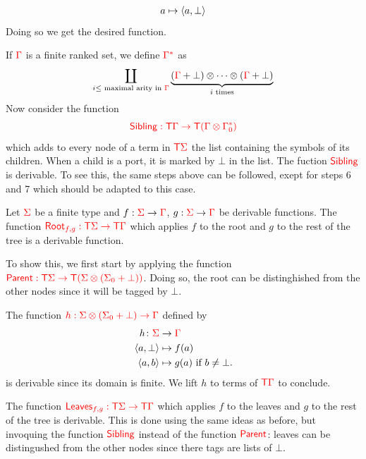 \begin{example}
\begin{enumerate}
\begin{align*}
a \mapsto \langle{a,\bot}\rangle
\end{align*}
 Doing so we get the desired function.
\end{enumerate}
\medskip
If ${\color{red}{\Gamma}}$ is a finite ranked set, we define ${\color{red}{\Gamma^*}}$ as
$$\coprod_{i \leq \text{ maximal arity in } {\color{red}{\Gamma}}} \underbrace{({\color{red}{\Gamma}}+\bot) \otimes \cdots \otimes ({\color{red}{\Gamma}}+\bot)}_{i\text{ times}}$$
Now consider the function $${\color{red}{\mathsf{Sibling}:{\color{red}{\mathsf T}}{\color{red}{\Gamma}}\to {\color{red}{\mathsf T}}({\color{red}{\Gamma}}\otimes {\color{red}{\Gamma}}^*_0)}}$$ which adds to every node of a term in ${\color{red}{\mathsf T}} {\color{red}{\Sigma}}$ the list containing the symbols of its children. When a child is a port, it is marked by $\bot$ in the list.
The fuction ${\color{red}{\mathsf{Sibling}}}$ is derivable. To see this, the same steps above can be followed, exept for steps 6 and 7 which should be adapted to this case. 
\end{example}



\medskip
\noindent  \begin{example} Let ${\color{red}{\Sigma}}$ be a finite type and $f:{\color{red}{\Sigma}} \to {\color{red}{\Gamma}}$, $g: {\color{red}{\Sigma}} \to {\color{red}{\Gamma}}$ be derivable functions. The function ${\color{red}{\mathsf{Root}_{f,g} : {\color{red}{\mathsf T}}{\color{red}{\Sigma}}\to {\color{red}{\mathsf T}}{\color{red}{\Gamma}}}}$
which applies $f$ to the root and $g$ to the rest of the tree is a derivable function.
 
To show this, we first start by applying the function ${\color{red}{\mathsf{Parent}:{\color{red}{\mathsf T}}{\color{red}{\Sigma}}\to{\color{red}{\mathsf T}}({\color{red}{\Sigma}}\otimes({\color{red}{\Sigma}}_0+\bot))}}$. Doing so, the root can be distinghished from the other nodes since it will be tagged by $\bot$.  

The function ${\color{red}{h:{\color{red}{\Sigma}}\otimes({\color{red}{\Sigma}}_0+\bot)\to {\color{red}{\Gamma}}}}$ defined by 
\begin{align*}
  h\colon {\color{red}{\Sigma}} &\to {\color{red}{\Gamma}} \\
  \langle{a,\bot}\rangle &\mapsto f(a) \\
  \langle{a,b}\rangle &\mapsto g(a) \text{ if } b\neq \bot.
\end{align*}
is derivable since its domain is finite. 
We lift $h$ to terms of ${\color{red}{\mathsf T}}{\color{red}{\Gamma}}$ to conclude.



\medskip
The function ${\color{red}{\mathsf{Leaves}_{f,g} : {\color{red}{\mathsf T}}{\color{red}{\Sigma}}\to {\color{red}{\mathsf T}}{\color{red}{\Gamma}}}}$
 which applies $f$ to the leaves and $g$ to the rest of the tree is derivable. This is done using the same ideas as before, but invoquing the function ${\color{red}{\mathsf{Sibling}}}$ instead of the function ${\color{red}{\mathsf{Parent}}}$: leaves can be distingushed from the other nodes since there tags are lists of $\bot$.
\end{example}

